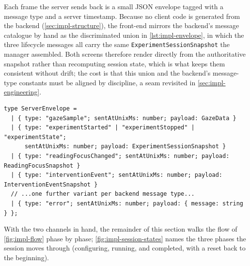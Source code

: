 Each frame the server sends back is a small JSON envelope tagged with a message type and a server timestamp.
Because no client code is generated from the backend (\cref{sec:impl-structure}), the front-end mirrors the backend's message catalogue by hand as the discriminated union in \cref{lst:impl-envelope}, in which the three lifecycle messages all carry the same \texttt{ExperimentSessionSnapshot} the manager assembled.
Both screens therefore render directly from the authoritative snapshot rather than recomputing session state, which is what keeps them consistent without drift; the cost is that this union and the backend's message-type constants must be aligned by discipline, a seam revisited in \cref{sec:impl-engineering}.

\begin{listing}[htbp]
\begin{verbatim}
type ServerEnvelope =
  | { type: "gazeSample"; sentAtUnixMs: number; payload: GazeData }
  | { type: "experimentStarted" | "experimentStopped" | "experimentState";
      sentAtUnixMs: number; payload: ExperimentSessionSnapshot }
  | { type: "readingFocusChanged"; sentAtUnixMs: number; payload: ReadingFocusSnapshot }
  | { type: "interventionEvent"; sentAtUnixMs: number; payload: InterventionEventSnapshot }
  // ...one further variant per backend message type...
  | { type: "error"; sentAtUnixMs: number; payload: { message: string } };
\end{verbatim}
\caption{Front-end inbound message union (abbreviated from \texttt{lib/gaze-socket.ts}). Hand-mirrored from the backend message catalogue; lifecycle variants carry \texttt{ExperimentSessionSnapshot}.}
\label{lst:impl-envelope}
\end{listing}

With the two channels in hand, the remainder of this section walks the flow of \cref{fig:impl-flow} phase by phase; \cref{fig:impl-session-states} names the three phases the session moves through (configuring, running, and completed, with a reset back to the beginning).

